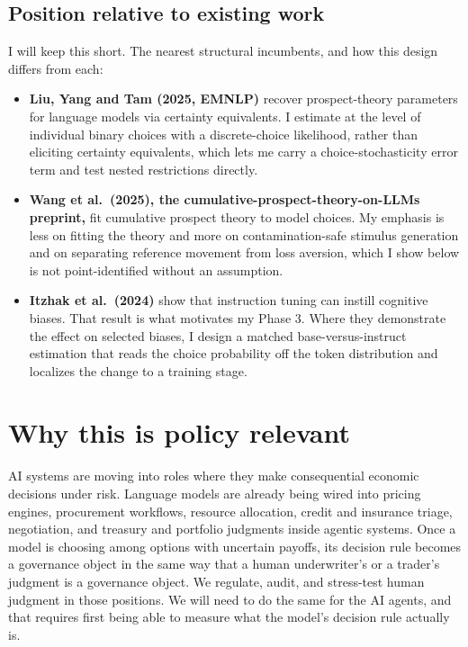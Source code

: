\documentclass[11pt]{article}
\begin{document}
\subsection{Position relative to existing work}

I will keep this short. The nearest structural incumbents, and how this design differs from each:

\begin{itemize}[leftmargin=1.4em]
\item \textbf{Liu, Yang and Tam (2025, EMNLP)} recover prospect-theory parameters for language models
via certainty equivalents. I estimate at the level of individual binary choices with a discrete-choice
likelihood, rather than eliciting certainty equivalents, which lets me carry a choice-stochasticity
error term and test nested restrictions directly.
\item \textbf{Wang et al.\ (2025), the cumulative-prospect-theory-on-LLMs preprint,} fit cumulative
prospect theory to model choices. My emphasis is less on fitting the theory and more on
contamination-safe stimulus generation and on separating reference movement from loss aversion, which
I show below is not point-identified without an assumption.
\item \textbf{Itzhak et al.\ (2024)} show that instruction tuning can instill cognitive biases. That
result is what motivates my Phase 3. Where they demonstrate the effect on selected biases, I design a
matched base-versus-instruct estimation that reads the choice probability off the token distribution and
localizes the change to a training stage.
\end{itemize}

\section{Why this is policy relevant}

AI systems are moving into roles where they make consequential economic decisions under risk. Language
models are already being wired into pricing engines, procurement workflows, resource allocation, credit
and insurance triage, negotiation, and treasury and portfolio judgments inside agentic systems. Once a
model is choosing among options with uncertain payoffs, its decision rule becomes a governance object in
the same way that a human underwriter's or a trader's judgment is a governance object. We regulate,
audit, and stress-test human judgment in those positions. We will need to do the same for the AI agents,
and that requires first being able to measure what the model's decision rule actually is.
\end{document}
